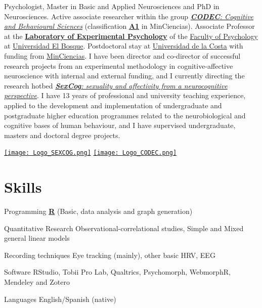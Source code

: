 \documentclass[11pt,a4paper,]{awesome-cv}
\begin{document}
\begin{minipage}[c]{0.85\linewidth}
Psychologist, Master in Basic and Applied Neurosciences and PhD in Neurosciences. Active associate researcher within the group \href{https://investigaciones.unbosque.edu.co/codec}{\textit{\textbf{CODEC}: Cognitive and Behavioural Sciences}} (classification \href{https://scienti.minciencias.gov.co/gruplac/jsp/visualiza/visualizagr.jsp?nro=00000000001446}{\textbf{A1}} in MinCiencias). Associate Professor at the \href{https://grupo-codec.netlify.app/labpsiexp/}{\textbf{Laboratory of Experimental Psychology}} of the \href{https://www.uelbosque.edu.co/psicologia}{Faculty of Psychology} at \href{https://www.uelbosque.edu.co/}{Universidad El Bosque}. Postdoctoral stay at \href{https://www.cuc.edu.co/}{Universidad de la Costa} with funding from \href{https://minciencias.gov.co/}{MinCiencias}. I have been director and co-director of successful research projects from an experimental methodology in cognitive-affective neuroscience with internal and external funding, and I currently directing the research hotbed \href{https://grupo-codec.netlify.app/sexcog/}{\textit{\textbf{SexCog}: sexuality and affectivity from a neurocognitive perspective}}. I have 13 years of professional and university teaching experience, applied to the development and implementation of undergraduate and postgraduate higher education programmes related to the neurobiological and cognitive bases of human behaviour, and I have supervised undergraduate, masters and doctoral degree projects.
\end{minipage} \begin{minipage}[c]{0.15\linewidth}
\begin{flushright} 
\hfill \href{https://grupo-codec.netlify.app/sexcog/}{\texttt{[image: Logo\_SEXCOG.png]}} \newline \href{https://investigaciones.unbosque.edu.co/codec}{\texttt{[image: Logo\_CODEC.png]}}
\end{flushright}
\end{minipage}

\hypertarget{skills-1}{%
\section{Skills}\label{skills-1}}

\begin{cvskills}
  \cvskill
    {Programming}
    {\href{https://www.r-project.org/}{\textbf{R}} (Basic, data analysis and graph generation)}

  \cvskill
    {Quantitative Research}
    {Observational-correlational studies, Simple and Mixed general linear models}
  
  \cvskill
    {Recording techniques}
    {Eye tracking (mainly), other basic HRV, EEG}

  \cvskill
    {Software}
    {RStudio, Tobii Pro Lab, Qualtrics, Psychomorph, WebmorphR, Mendeley and Zotero}

  \cvskill
    {Languages}
    {English/Spanish (native)}
\end{cvskills}
\end{document}
